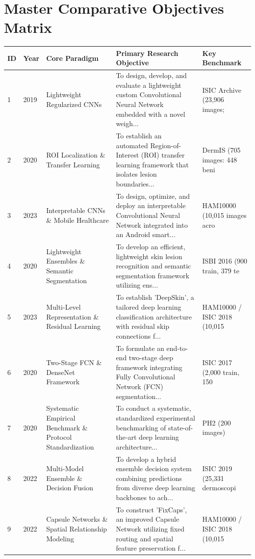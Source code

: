 \documentclass[10pt,a4paper]{article}
\begin{document}
\section{Master Comparative Objectives Matrix}
\small
\begin{longtable}{p{0.6cm} p{1.2cm} p{3.2cm} p{7.0cm} p{2.8cm}}
\toprule
\textbf{ID} & \textbf{Year} & \textbf{Core Paradigm} & \textbf{Primary Research Objective} & \textbf{Key Benchmark} \\
\midrule
\endhead
1 & 2019 & Lightweight Regularized CNNs & To design, develop, and evaluate a lightweight custom Convolutional Neural Network embedded with a novel weigh... & ISIC Archive (23,906 images; \\
2 & 2020 & ROI Localization \& Transfer Learning & To establish an automated Region-of-Interest (ROI) transfer learning framework that isolates lesion boundaries... & DermIS (705 images: 448 beni \\
3 & 2023 & Interpretable CNNs \& Mobile Healthcare & To design, optimize, and deploy an interpretable Convolutional Neural Network integrated into an Android smart... & HAM10000 (10,015 images acro \\
4 & 2020 & Lightweight Ensembles \& Semantic Segmentation & To develop an efficient, lightweight skin lesion recognition and semantic segmentation framework utilizing ens... & ISBI 2016 (900 train, 379 te \\
5 & 2023 & Multi-Level Representation \& Residual Learning & To establish 'DeepSkin', a tailored deep learning classification architecture with residual skip connections f... & HAM10000 / ISIC 2018 (10,015 \\
6 & 2020 & Two-Stage FCN \& DenseNet Framework & To formulate an end-to-end two-stage deep framework integrating Fully Convolutional Network (FCN) segmentation... & ISIC 2017 (2,000 train, 150  \\
7 & 2020 & Systematic Empirical Benchmark \& Protocol Standardization & To conduct a systematic, standardized experimental benchmarking of state-of-the-art deep learning architecture... & PH2 (200 images) \\
8 & 2022 & Multi-Model Ensemble \& Decision Fusion & To develop a hybrid ensemble decision system combining predictions from diverse deep learning backbones to ach... & ISIC 2019 (25,331 dermoscopi \\
9 & 2022 & Capsule Networks \& Spatial Relationship Modeling & To construct 'FixCaps', an improved Capsule Network utilizing fixed routing and spatial feature preservation f... & HAM10000 / ISIC 2018 (10,015 \\

\end{longtable}
\end{document}
